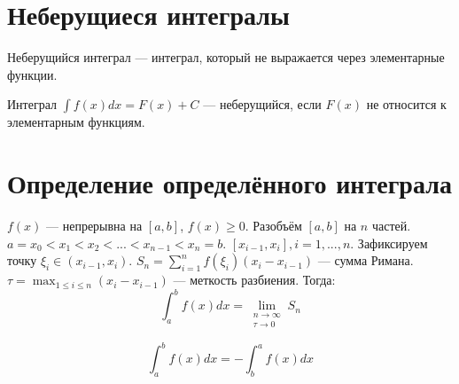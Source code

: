 \documentclass[12pt]{article}
\begin{document}
\section{Неберущиеся интегралы}
Неберущийся интеграл — интеграл, который не выражается через элементарные функции.

Интеграл $\int f(x)dx = F(x) + C$ — неберущийся, если $F(x)$ не относится к элементарным функциям.

\section{Определение определённого интеграла}

$f(x)$ — непрерывна на $[a, b]$, $f(x) \geq 0$. Разобъём $[a, b]$ на $n$ частей. $a = x_0 < x_1 < x_2 < ... < x_{n - 1} < x_n = b$. $[x_{i - 1}, x_i], i = 1, ..., n$. Зафиксируем точку $\xi_i \in (x_{i - 1}, x_i)$. $\displaystyle S_n = \sum^n_{i = 1} f(\xi_i)(x_i - x_{i - 1})$ — сумма Римана. $\displaystyle \tau = \max_{1 \leq i \leq n} (x_i - x_{i-1})$ — меткость разбиения. Тогда:
\[
    \int_a^b f(x)dx = \lim_{
        \substack{
            n \rightarrow \infty \\
            \tau \rightarrow 0
        }} S_n
\]

\[
    \int_a^b f(x)dx = - \int_b^a f(x)dx
\]
\end{document}
